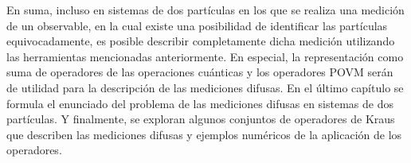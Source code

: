 En suma, incluso en sistemas de dos partículas en los que se realiza una
medición de un observable, en la cual existe una posibilidad de identificar las
partículas equivocadamente, es posible describir completamente dicha medición
utilizando las herramientas mencionadas anteriormente. En especial, la
representación como suma de operadores de las operaciones cuánticas y los
operadores POVM serán de utilidad para la descripción de las mediciones
difusas. En el último capítulo se formula el enunciado del problema de las
mediciones difusas en sistemas de dos partículas. Y finalmente, se exploran
algunos conjuntos de operadores de Kraus que describen las mediciones difusas y
ejemplos numéricos de la aplicación de los operadores. 




